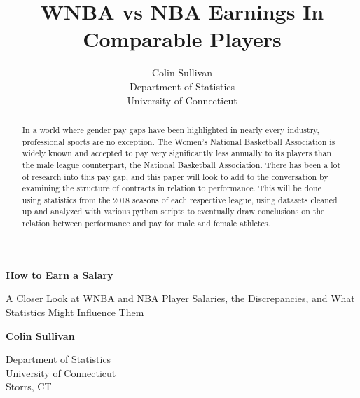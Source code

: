 \documentclass[12pt]{article}
\title{WNBA vs NBA Earnings In Comparable Players}
\author{Colin Sullivan\\
  Department of Statistics\\
  University of Connecticut
}
\begin{document}
   \begin{center}
       \vspace*{1cm}
       \Huge
       \textbf{How to Earn a Salary}

       \Large
       \vspace{0.5cm}
        A Closer Look at WNBA and NBA Player Salaries, the Discrepancies, and What Statistics Might Influence Them
            
       \vspace{1.5cm}

       \textbf{Colin Sullivan}
       
       \vfill


       \vfill
            
            
       \vspace{0.8cm}
     
         
        \Large    
       Department of Statistics\\
       University of Connecticut\\
       Storrs, CT\\
            
   \end{center}
\newpage

\begin{abstract}
In a world where gender pay gaps have been highlighted in nearly every industry, professional sports are no exception. The Women’s National Basketball 
Association is widely known and accepted to pay very significantly less annually to its players than the male league counterpart, the National Basketball 
Association. There has been a lot of research into this pay gap, and this paper will look to add to the conversation by examining the structure of 
contracts in relation to performance. This will be done using statistics from the 2018 seasons of each respective league, using datasets cleaned up and 
analyzed with various python scripts to eventually draw conclusions on the relation between performance and pay for male and female athletes.	
\end{abstract}
\end{document}
